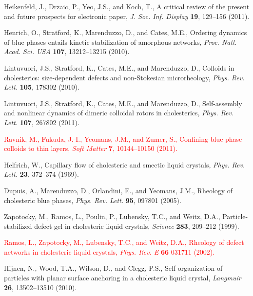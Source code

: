 \documentclass[12pt]{article}
\begin{document}
\begin{thebibliography}{99}
Heikenfeld, J., Drzaic, P., Yeo, J.S., and Koch, T.,
A critical review of the present and future prospects for electronic paper,
{\it J. Soc. Inf. Display} {\bf 19}, 129--156 (2011).

Henrich, O., Stratford, K., Marenduzzo, D., and  Cates, M.E.,
Ordering dynamics of blue phases entails kinetic stabilization of amorphous
networks, {\it Proc. Natl. Acad. Sci. USA} {\bf 107}, 13212--13215 (2010).

Lintuvuori, J.S.,  Stratford, K., Cates, M.E., and Marenduzzo, D.,
Colloids in cholesterics: size-dependent defects and non-Stokesian
microrheology, {\it Phys. Rev. Lett.} {\bf 105}, 178302 (2010).

Lintuvuori, J.S.,  Stratford, K.,  Cates, M.E., and  Marenduzzo, D.,
Self-assembly and nonlinear dynamics of dimeric colloidal rotors in 
cholesterics, {\it Phys. Rev. Lett.} {\bf 107}, 267802 (2011).

\textcolor{red}{Ravnik, M., Fukuda, J.-I.,  Yeomans, J.M., and Zumer, S.,
Confining blue phase colloids to thin layers,
{\it Soft Matter} {\bf 7}, 10144--10150 (2011).}

 	Helfrich, W.,
Capillary flow of cholesteric and smectic liquid crystals,
{\it Phys. Rev. Lett.} {\bf 23}, 372--374 (1969).

Dupuis, A.,  Marenduzzo, D.,  Orlandini, E., and Yeomans, J.M.,
Rheology of cholesteric blue phases,
{\it Phys. Rev. Lett.} {\bf 95}, 097801 (2005).

Zapotocky, M., Ramos, L., Poulin, P.,  Lubensky, T.C.,  and Weitz, D.A.,
Particle-stabilized defect gel in cholesteric liquid crystals,
{\it Science} {\bf 283}, 209--212 (1999).

\textcolor{red}{
Ramos, L., Zapotocky, M.,  Lubensky, T.C., and  Weitz, D.A.,
Rheology of defect networks in cholesteric liquid crystals,
{\it Phys. Rev. E} {\bf 66} 031711 (2002).}

 Hijnen, N., Wood, T.A., Wilson, D., and Clegg, P.S., 
Self-organization of particles with planar surface anchoring in a cholesteric
liquid crystal, {\it Langmuir} {\bf 26}, 13502--13510 (2010).


\end{thebibliography}
\end{document}

